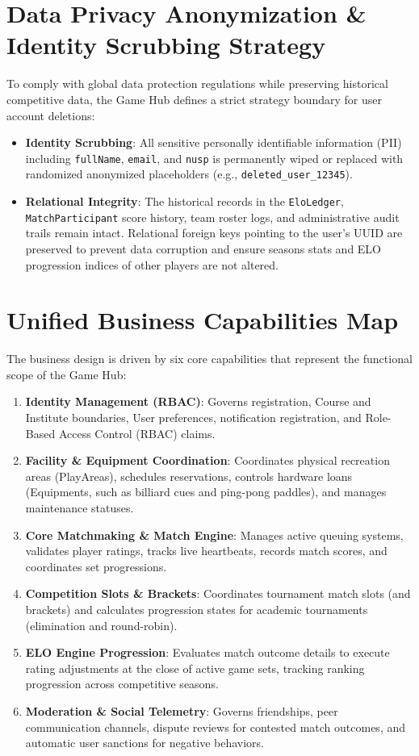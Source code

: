 \documentclass[11pt,a4paper]{report}
\begin{document}
\section{Data Privacy Anonymization \& Identity Scrubbing Strategy}

To comply with global data protection regulations while preserving historical competitive data, the Game Hub defines a strict strategy boundary for user account deletions:
\begin{itemize}
    \item \textbf{Identity Scrubbing}: All sensitive personally identifiable information (PII) including \texttt{fullName}, \texttt{email}, and \texttt{nusp} is permanently wiped or replaced with randomized anonymized placeholders (e.g., \texttt{deleted\_user\_12345}).
    \item \textbf{Relational Integrity}: The historical records in the \texttt{EloLedger}, \texttt{MatchParticipant} score history, team roster logs, and administrative audit trails remain intact. Relational foreign keys pointing to the user's UUID are preserved to prevent data corruption and ensure seasons stats and ELO progression indices of other players are not altered.
\end{itemize}

\newpage

\section{Unified Business Capabilities Map}

The business design is driven by six core capabilities that represent the functional scope of the Game Hub:
\begin{enumerate}
    \item \textbf{Identity Management (RBAC)}: Governs registration, Course and Institute boundaries, User preferences, notification registration, and Role-Based Access Control (RBAC) claims.
    \item \textbf{Facility \& Equipment Coordination}: Coordinates physical recreation areas (PlayAreas), schedules reservations, controls hardware loans (Equipments, such as billiard cues and ping-pong paddles), and manages maintenance statuses.
    \item \textbf{Core Matchmaking \& Match Engine}: Manages active queuing systems, validates player ratings, tracks live heartbeats, records match scores, and coordinates set progressions.
    \item \textbf{Competition Slots \& Brackets}: Coordinates tournament match slots (and brackets) and calculates progression states for academic tournaments (elimination and round-robin).
    \item \textbf{ELO Engine Progression}: Evaluates match outcome details to execute rating adjustments at the close of active game sets, tracking ranking progression across competitive seasons.
    \item \textbf{Moderation \& Social Telemetry}: Governs friendships, peer communication channels, dispute reviews for contested match outcomes, and automatic user sanctions for negative behaviors.
\end{enumerate}
\end{document}

